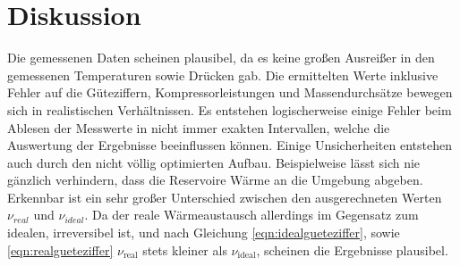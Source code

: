 \section{Diskussion}
Die gemessenen Daten scheinen plausibel, da es keine großen Ausreißer in den gemessenen Temperaturen
sowie Drücken gab. Die ermittelten Werte inklusive Fehler auf die Güteziffern, Kompressorleistungen und Massendurchsätze 
bewegen sich in realistischen Verhältnissen. 
Es entstehen logischerweise einige Fehler beim Ablesen der Messwerte in nicht immer exakten Intervallen, welche die 
Auswertung der Ergebnisse beeinflussen können.
Einige Unsicherheiten entstehen auch durch den nicht völlig optimierten Aufbau. Beispielweise lässt sich nie gänzlich
verhindern, dass die Reservoire Wärme an die Umgebung abgeben. 
Erkennbar ist ein sehr großer Unterschied zwischen den ausgerechneten Werten $\nu_{real}$ und $\nu_{ideal}$. 
Da der reale Wärmeaustausch allerdings im Gegensatz zum idealen, irreversibel ist,
und nach Gleichung \eqref{eqn:idealgueteziffer}, sowie \eqref{eqn:realgueteziffer} $\nu_{\text{real}}$ stets kleiner als $\nu_{\text{ideal}}$, scheinen die Ergebnisse plausibel.